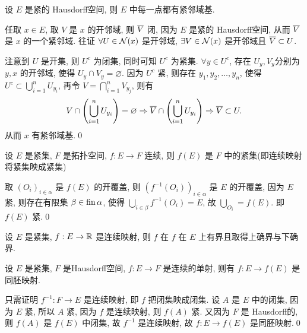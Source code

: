      \begin{Proposition}
          设 $ E $ 是紧的 Hausdorff空间, 则 $ E $ 中每一点都有紧邻域基.
     \end{Proposition}

     \begin{Proof}
          任取 $ x\in E $, 取 $ V $ 是 $ x $ 的开邻域, 则 $ \baro{V} $ 闭, 因为 $ E $ 是紧的 Hausdorff空间, 从而 $ \baro{V} $ 是 $ x $ 的一个紧邻域. 往证 $ \forall U\in\CN{x} $ 是开邻域, $ \exists V\in\CN{x} $ 是开邻域且 $ \baro{V}\subset U $. 
          
          注意到 $ U $ 是开集, 则 $ U^{c} $ 为闭集, 同时可知 $ U^{c} $ 为紧集. $ \forall y\in U^{c} $, 存在  $ U_{y}, V_{y} $分别为 $ y, x $ 的开邻域, 使得 $ U_{y}\cap V_{y}=\varnothing $. 因为 $ U^{c} $ 紧, 则存在 $ y_{1}, y_{2}, \dots, y_{n} $, 使得 $ U^{c}\subset \bigcup_{i=1}^{n}U_{y_{i}} $, 再令 $ V=\bigcap_{i=1}^{n}V_{y_{j}} $, 则有
          \[
               V\cap\left( \bigcup_{i=1}^{n}U_{y_{i}} \right)=\varnothing\Rightarrow \baro{V}\cap\left( \bigcup_{i=1}^{n}U_{y_{i}} \right)\Rightarrow \baro{V}\subset U.
          \]
          从而 $ x $ 有紧邻域基.\qed
     \end{Proof}

     \begin{Proposition}
          设 $ E $ 是紧集,  $ F $ 是拓扑空间,  $ f:E\to F $ 连续, 则 $ f(E) $ 是 $ F $ 中的紧集(即连续映射将紧集映成紧集)
     \end{Proposition}

     \begin{Proof}
          取 $ (O_{i})_{i\in\alpha} $ 是 $ f(E) $ 的开覆盖, 则 $ (f^{-1}(O_{i}))_{i\in\alpha} $ 是 $ E $ 的开覆盖, 因为 $ E $ 紧, 则存在有限集 $ \beta\in\fin\alpha $, 使得 $ \bigcup_{i\in\beta}f^{-1}(O_{i})=E $, 故 $ \bigcup_{O_{i}}=f(E) $. 即 $ f(E) $ 紧.\qed
     \end{Proof}

     \begin{Corollary}
          设 $ E $ 是紧集, $ f:E\to\R $ 是连续映射, 则 $ f $ 在 $ f $ 在 $ E $ 上有界且取得上确界与下确界.
     \end{Corollary}

     \begin{Proposition}
          设 $ E $ 是紧集,  $ F $ 是Hausdorff空间,  $ f:E\to F $ 是连续的单射, 则有 $ f:E\to f(E) $ 是同胚映射.
     \end{Proposition}

     \begin{Proof}
          只需证明 $ f^{-1}:F\to E $ 是连续映射, 即 $ f $ 把闭集映成闭集. 设 $ A $ 是 $ E $ 中的闭集, 因为 $ E $ 紧, 所以 $ A $ 紧, 因为 $ f $ 是连续映射, 则 $ f(A) $ 紧. 又因为 $ F $ 是 Hausdorff的, 则 $ f(A) $ 是 $ f(E) $ 中闭集, 故 $ f^{-1} $ 是连续映射, 故 $ f:E\to f(E) $ 是同胚映射.\qed
     \end{Proof}

